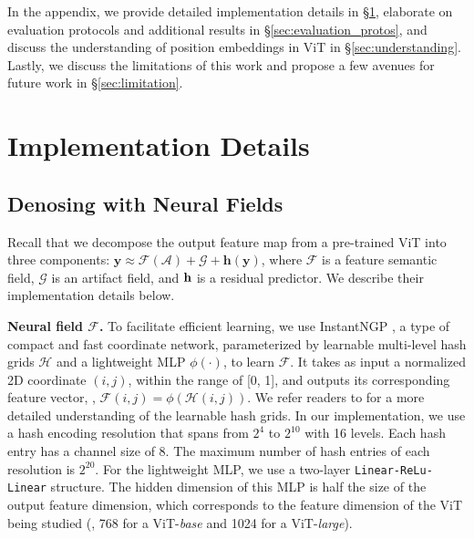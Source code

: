 \documentclass[runningheads]{llncs}
\renewcommand{\paragraph}[1]{\vspace{1.25mm}\noindent\textbf{#1}}
\begin{document}
In the appendix, we provide detailed implementation details in \S\ref{sec:impl_details}, elaborate on evaluation protocols and additional results in \S\ref{sec:evaluation_protos}, and discuss the understanding of position embeddings in ViT in \S\ref{sec:understanding}. Lastly, we discuss the limitations of this work and propose a few avenues for future work in \S\ref{sec:limitation}.


\section{Implementation Details}
\label{sec:impl_details}

\subsection{Denosing with Neural Fields}

Recall that we decompose the output feature map from a pre-trained ViT into three components: $\mathbf{y}\approx \mathcal{F}(\mathcal{A}) + \mathcal{G} + \mathbf{h}(\mathbf{y})$, where $\mathcal{F}$ is a feature semantic field, $\mathcal{G}$ is an artifact field, and $\vb{h}$ is a residual predictor. We describe their implementation details below.

\paragraph{Neural field $\mathcal{F}$.} To facilitate efficient learning, we use InstantNGP \cite{muller2022instant}, a type of compact and fast coordinate network, parameterized by learnable multi-level hash grids $\mathcal{H}$ and a lightweight MLP $\phi(\cdot)$, to learn $\mathcal{F}$. It takes as input a normalized 2D coordinate $(i, j)$, within the range of [0, 1], and outputs its corresponding feature vector, \ie, $\mathcal{F}(i, j) = \phi\left(\mathcal{H}(i, j)\right)$. We refer readers to \cite{muller2022instant} for a more detailed understanding of the learnable hash grids.  In our implementation, we use a hash encoding resolution that spans from $2^4$ to $2^{10}$ with 16 levels. Each hash entry has a channel size of 8. The maximum number of hash entries of each resolution is $2^{20}$. For the lightweight MLP, we use a two-layer \texttt{Linear-ReLu-Linear} structure. The hidden dimension of this MLP is half the size of the output feature dimension, which corresponds to the feature dimension of the ViT being studied (\eg, 768 for a ViT-\textit{base} and 1024 for a ViT-\textit{large}).
\end{document}
